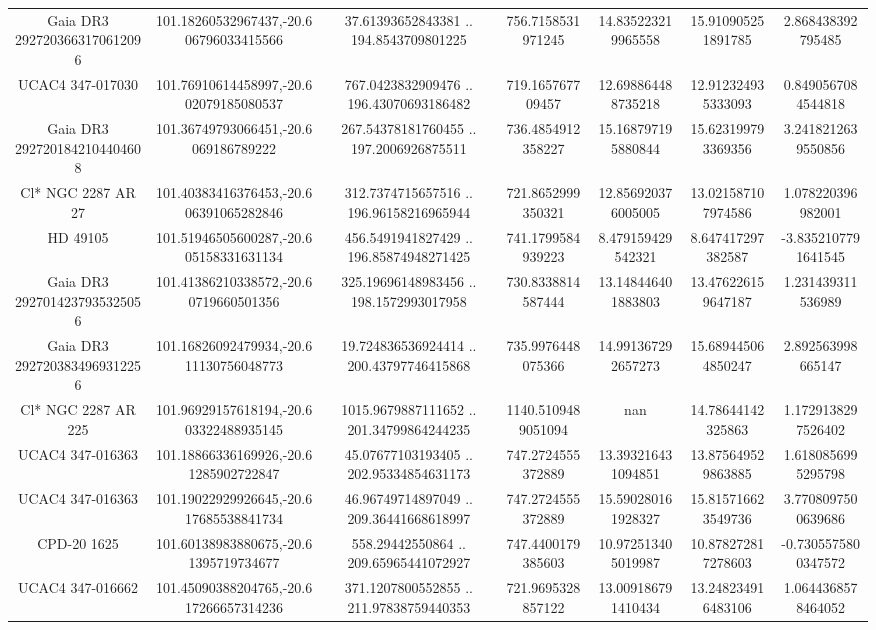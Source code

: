 \begin{table}
\begin{tabular}{ccccccc}
Gaia DR3 2927203663170612096 & 101.18260532967437,-20.606796033415566 & 37.61393652843381 .. 194.8543709801225 & 756.7158531971245 & 14.835223219965558 & 15.910905251891785 & 2.868438392795485 \\
UCAC4 347-017030 & 101.76910614458997,-20.602079185080537 & 767.0423832909476 .. 196.43070693186482 & 719.165767709457 & 12.698864488735218 & 12.912324935333093 & 0.8490567084544818 \\
Gaia DR3 2927201842104404608 & 101.36749793066451,-20.6069186789222 & 267.54378181760455 .. 197.2006926875511 & 736.4854912358227 & 15.168797195880844 & 15.623199793369356 & 3.2418212639550856 \\
Cl* NGC 2287     AR      27 & 101.40383416376453,-20.606391065282846 & 312.7374715657516 .. 196.96158216965944 & 721.8652999350321 & 12.856920376005005 & 13.021587107974586 & 1.078220396982001 \\
HD  49105 & 101.51946505600287,-20.605158331631134 & 456.5491941827429 .. 196.85874948271425 & 741.1799584939223 & 8.479159429542321 & 8.647417297382587 & -3.8352107791641545 \\
Gaia DR3 2927014237935325056 & 101.41386210338572,-20.60719660501356 & 325.19696148983456 .. 198.1572993017958 & 730.8338814587444 & 13.148446401883803 & 13.476226159647187 & 1.231439311536989 \\
Gaia DR3 2927203834969312256 & 101.16826092479934,-20.611130756048773 & 19.724836536924414 .. 200.43797746415868 & 735.9976448075366 & 14.991367292657273 & 15.689445064850247 & 2.892563998665147 \\
Cl* NGC 2287     AR     225 & 101.96929157618194,-20.603322488935145 & 1015.9679887111652 .. 201.34799864244235 & 1140.5109489051094 & nan & 14.78644142325863 & 1.1729138297526402 \\
UCAC4 347-016363 & 101.18866336169926,-20.61285902722847 & 45.07677103193405 .. 202.95334854631173 & 747.2724555372889 & 13.393216431094851 & 13.875649529863885 & 1.6180856995295798 \\
UCAC4 347-016363 & 101.19022929926645,-20.617685538841734 & 46.96749714897049 .. 209.36441668618997 & 747.2724555372889 & 15.590280161928327 & 15.815716623549736 & 3.7708097500639686 \\
CPD-20  1625 & 101.60138983880675,-20.61395719734677 & 558.29442550864 .. 209.65965441072927 & 747.4400179385603 & 10.972513405019987 & 10.878272817278603 & -0.7305575800347572 \\
UCAC4 347-016662 & 101.45090388204765,-20.617266657314236 & 371.1207800552855 .. 211.97838759440353 & 721.9695328857122 & 13.009186791410434 & 13.248234916483106 & 1.0644368578464052 \\

\end{tabular}
\end{table}
